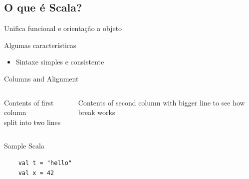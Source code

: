 \documentclass{beamer}
\begin{document}
\subsection{O que é Scala?}

\begin{frame}{Unifica funcional e orientação a objeto} 
\end{frame}
\begin{frame}{Algumas características} 
    \begin{itemize}
	\item Sintaxe simples e consistente 
    \end{itemize}
\end{frame}
 
\begin{frame}{Columns and Alignment}
     \begin{columns}[t] %
     \begin{column}[T]{5cm} %
     Contents of first column \\ split into two lines
     \end{column}
     \begin{column}[T]{5cm} %
	Contents of second column with bigger line to see how break works
     \end{column}
     \end{columns}
\end{frame}

\begin{frame}[fragile] {Sample Scala}

    \begin{lstlisting}
    val t = "hello" 
    val x = 42 
    \end{lstlisting}

\end{frame}
\end{document}
